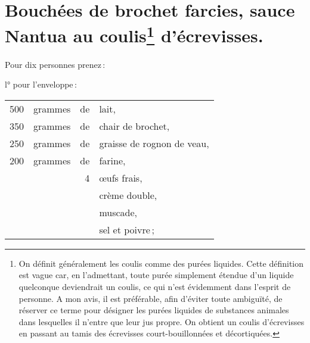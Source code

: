 \section*{\centering Bouchées de brochet farcies, sauce Nantua au coulis\footnote{On définit
généralement les coulis comme des purées liquides. Cette définition est vague car,
en l'admettant, toute purée simplement étendue d'un liquide quelconque deviendrait
un coulis, ce qui n'est évidemment dans l'esprit de personne.
\protect\endgraf
A mon avis, il est préférable, afin d'éviter toute ambiguïté, de réserver ce
terme pour désigner les purées liquides de substances animales dans lesquelles
il n'entre que leur jus propre.
\protect\endgraf
On obtient un coulis d'écrevisses en passant au tamis des écrevisses
court-bouillonnées et décortiquées.} d’écrevisses.}


Pour dix personnes prenez :

\medskip

l° pour l'enveloppe :

\footnotesize
\begin{longtable}{rrrp{16em}}
    500 & grammes & de & lait,                                                                            \\
    350 & grammes & de & chair de brochet,                                                                \\
    250 & grammes & de & graisse de rognon de veau,                                                       \\
    200 & grammes & de & farine,                                                                          \\
        &         &  4 & œufs frais,                                                                      \\
        &         &    & crème double,                                                                    \\
        &         &    & muscade,                                                                         \\
        &         &    & sel et poivre ;                                                                  \\
\end{longtable}
\normalsize

